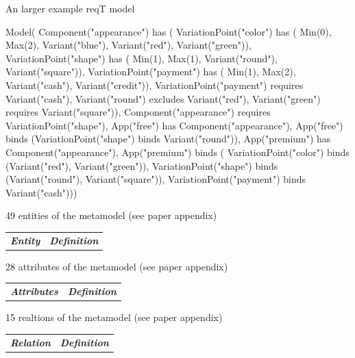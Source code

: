 \documentclass{slides}
\begin{document}
\begin{Slide}{An larger example reqT model}
\begin{Code}
Model(
  Component("appearance") has (
    VariationPoint("color") has (
      Min(0), Max(2), Variant("blue"), Variant("red"), Variant("green")),
    VariationPoint("shape") has (
      Min(1), Max(1), Variant("round"), Variant("square")),
    VariationPoint("payment") has (
      Min(1), Max(2), Variant("cash"), Variant("credit")),
    VariationPoint("payment") requires Variant("cash"), 
    Variant("round") excludes Variant("red"),
    Variant("green") requires Variant("square")),
  Component("appearance") requires VariationPoint("shape"), 
  App("free") has Component("appearance"),  
  App("free") binds (VariationPoint("shape") binds Variant("round")),
  App("premium") has Component("appearance"),  
  App("premium") binds ( 
    VariationPoint("color") binds (Variant("red"), Variant("green")),
    VariationPoint("shape") binds (Variant("round"), Variant("square")),
    VariationPoint("payment") binds Variant("cash")))
\end{Code}
\end{Slide}

\begin{Slide}{49 entities of the metamodel (see paper appendix)}
\fontsize{3.5}{4.0}\selectfont
\begin{tabular}{l l}
\textbf{\textit{Entity}} & \textbf{\textit{Definition}}  \\

\end{tabular}
\end{Slide}

\begin{Slide}{28 attributes of the metamodel (see paper appendix)}
\fontsize{6}{6.5}\selectfont
\begin{tabular}{l l}
\textbf{\textit{Attributes}} & \textbf{\textit{Definition}}  \\

\end{tabular}
\end{Slide}


\begin{Slide}{15 realtions of the metamodel (see paper appendix)}
\fontsize{8}{9}\selectfont
\begin{tabular}{l l}
\textbf{\textit{Relation}} & \textbf{\textit{Definition}}  \\

\end{tabular}
\end{Slide}
\end{document}
